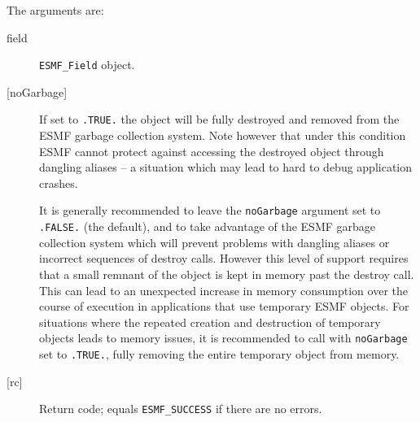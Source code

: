    The arguments are:
   \begin{description}
   \item[field]
   {\tt ESMF\_Field} object.
   \item[{[noGarbage]}]
   If set to {\tt .TRUE.} the object will be fully destroyed and removed
   from the ESMF garbage collection system. Note however that under this
   condition ESMF cannot protect against accessing the destroyed object
   through dangling aliases -- a situation which may lead to hard to debug
   application crashes.
  
   It is generally recommended to leave the {\tt noGarbage} argument
   set to {\tt .FALSE.} (the default), and to take advantage of the ESMF
   garbage collection system which will prevent problems with dangling
   aliases or incorrect sequences of destroy calls. However this level of
   support requires that a small remnant of the object is kept in memory
   past the destroy call. This can lead to an unexpected increase in memory
   consumption over the course of execution in applications that use
   temporary ESMF objects. For situations where the repeated creation and
   destruction of temporary objects leads to memory issues, it is
   recommended to call with {\tt noGarbage} set to {\tt .TRUE.}, fully
   removing the entire temporary object from memory.
   \item[{[rc]}]
   Return code; equals {\tt ESMF\_SUCCESS} if there are no errors.
   \end{description}
  
\setlength{\parskip}{\oldparskip}
\setlength{\parindent}{\oldparindent}
\setlength{\baselineskip}{\oldbaselineskip}
